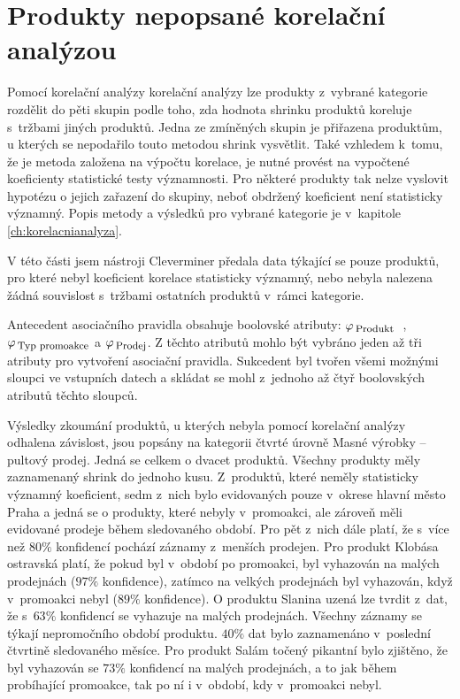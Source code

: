 \section{Produkty nepopsané korelační analýzou}

Pomocí korelační analýzy korelační analýzy lze produkty z~vybrané kategorie rozdělit do pěti skupin podle toho, zda hodnota shrinku produktů koreluje s~tržbami jiných produktů. Jedna ze zmíněných skupin je přiřazena produktům, u kterých se nepodařilo touto metodou shrink vysvětlit. Také vzhledem k~tomu, že je metoda založena na výpočtu korelace, je nutné provést na vypočtené koeficienty statistické testy významnosti. Pro některé produkty tak nelze vyslovit hypotézu o jejich zařazení do skupiny, neboť obdržený koeficient není statisticky významný. Popis metody a výsledků pro vybrané kategorie je v~kapitole \ref*{ch:korelacnianalyza}.

V této části jsem nástroji Cleverminer předala data týkající se pouze produktů, pro které nebyl koeficient korelace statisticky významný, nebo nebyla nalezena žádná souvislost s~tržbami ostatních produktů v~rámci kategorie.

Antecedent asociačního pravidla obsahuje boolovské atributy: 
$    \varphi_{\mbox{\,\footnotesize Produkt }}      $ , 
$    \varphi_{\mbox{\,\footnotesize Typ promoakce}} $ a 
$    \varphi_{\mbox{\,\footnotesize Prodej}}$. 
Z těchto atributů mohlo být vybráno jeden až tři atributy pro vytvoření asociační pravidla. Sukcedent byl tvořen všemi možnými sloupci ve vstupních datech a skládat se mohl z~jednoho až čtyř boolovských atributů těchto sloupců.

Výsledky zkoumání produktů, u kterých nebyla pomocí korelační analýzy odhalena závislost, jsou popsány na kategorii čtvrté úrovně Masné výrobky -- pultový prodej. Jedná se celkem o dvacet produktů.
Všechny produkty měly zaznamenaný shrink do jednoho kusu. 
Z~produktů, které neměly statisticky významný koeficient, sedm z~nich bylo evidovaných pouze v~okrese hlavní město Praha a jedná se o produkty, které nebyly v~promoakci, ale zároveň měli evidované prodeje během sledovaného období. Pro pět z~nich dále platí, že s~více než $80\%$ konfidencí pochází záznamy z~menších prodejen.
Pro produkt Klobása ostravská platí, že pokud byl v~období po promoakci, byl vyhazován na malých prodejnách ($97\%$ konfidence), zatímco na velkých prodejnách byl vyhazován, když v~promoakci nebyl ($89\%$ konfidence). 
O produktu Slanina uzená lze tvrdit z~dat, že s~$63\%$ konfidencí se vyhazuje na malých prodejnách. Všechny záznamy se týkají nepromočního období produktu. $40\%$ dat bylo zaznamenáno v~poslední čtvrtině sledovaného měsíce. 
Pro produkt Salám točený pikantní bylo zjištěno, že byl vyhazován se $ 73\%$ konfidencí na malých prodejnách, a to jak během probíhající promoakce, tak po ní  i v~období, kdy v~promoakci nebyl. 

